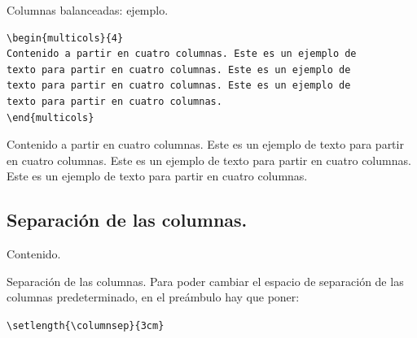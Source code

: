 \documentclass[dvipsnames,xcolor, handout]{beamer}
\theoremstyle{plain}
\theoremstyle{definition}
\begin{document}
\begin{frame}[fragile]{Columnas balanceadas: ejemplo.}
\begin{footnotesize}
\begin{verbatim}
\begin{multicols}{4}
Contenido a partir en cuatro columnas. Este es un ejemplo de
texto para partir en cuatro columnas. Este es un ejemplo de 
texto para partir en cuatro columnas. Este es un ejemplo de
texto para partir en cuatro columnas. 
\end{multicols}
\end{verbatim}
\end{footnotesize}
\vfill\pause
\begin{footnotesize}
    \begin{multicols}{4}
    Contenido a partir en cuatro columnas.  Este es un ejemplo de texto para
partir en cuatro columnas. Este es un ejemplo de texto para partir en cuatro
columnas. Este es un ejemplo de texto para partir en cuatro columnas. 
    \end{multicols}
\end{footnotesize}
\end{frame}

\subsection{Separación de las columnas.}
\begin{frame}{Contenido.}
 \begin{footnotesize}
\vspace*{-1cm}
\begin{multicols}{2}
  \tableofcontents[currentsubsection]
\end{multicols}
\end{footnotesize}
\end{frame}

\begin{frame}[fragile]{Separación de las columnas.}
Para poder cambiar el espacio de separación de las columnas predeterminado, en el preámbulo hay que poner:

\verb!\setlength{\columnsep}{3cm}!

\end{frame}
\end{document}

